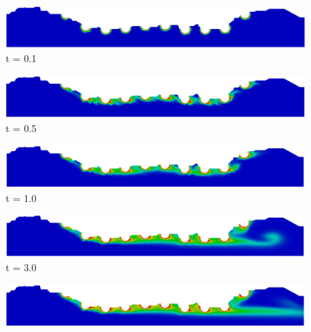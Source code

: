 \begin{figure}[H]
     \begin{minipage}{.50\linewidth}
      \centering
      \includegraphics[scale=0.18]{./02_chaps/cap_solution/figure/conc10_RealStrut1.png}\\
      t = 0.1
     \end{minipage}%
     \begin{minipage}{.50\linewidth}
      \centering
      \includegraphics[scale=0.18]{./02_chaps/cap_solution/figure/conc10_RealStrut2.png}\\
      t = 0.5
     \end{minipage}
     \begin{minipage}{.50\linewidth}
     \medskip
      \centering
      \includegraphics[scale=0.18]{./02_chaps/cap_solution/figure/conc10_RealStrut3.png}\\
      t = 1.0
     \end{minipage}%
     \begin{minipage}{.50\linewidth}
     \medskip
      \centering
      \includegraphics[scale=0.18]{./02_chaps/cap_solution/figure/conc10_RealStrut4.png}\\
      t = 3.0
     \end{minipage}
     \begin{minipage}{.50\linewidth}
      \centering
      \includegraphics[scale=0.18]{./02_chaps/cap_solution/figure/conc10_RealStrut5.png}\\

\end{minipage}
\end{figure}
